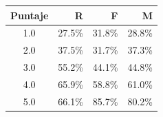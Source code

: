 \begin{tabular}{crrr}
\toprule
Puntaje & R & F & M \\
\midrule
1.0 & 27.5\% & 31.8\% & 28.8\% \\
2.0 & 37.5\% & 31.7\% & 37.3\% \\
3.0 & 55.2\% & 44.1\% & 44.8\% \\
4.0 & 65.9\% & 58.8\% & 61.0\% \\
5.0 & 66.1\% & 85.7\% & 80.2\% \\
\bottomrule
\end{tabular}
